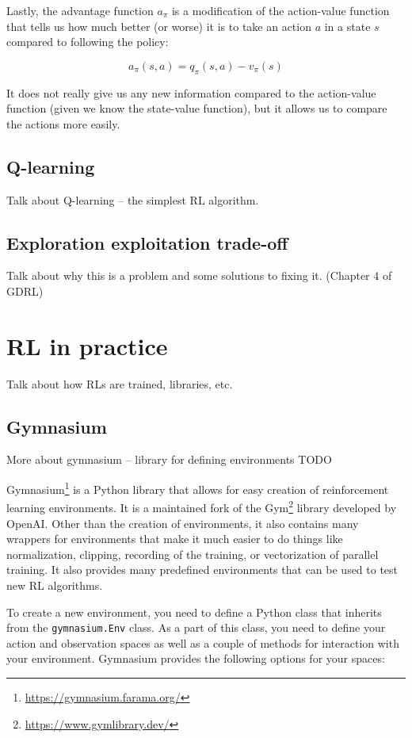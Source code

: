 \documentclass[
  digital,     %
  oneside,     %
  nosansbold,  %
  nocolorbold, %
  lof,         %
  lot,         %
]{fithesis4}
\begin{document}
Lastly, the advantage function $a_\pi$ is a modification of the action-value function that tells us how much better (or worse) it is to take an action $a$ in a state $s$ compared to following the policy:

\[
a_\pi(s,a) = q_\pi(s,a)-v_\pi(s)
\]

It does not really give us any new information compared to the action-value function (given we know the state-value function), but it allows us to compare the actions more easily.

\section{Q-learning}
Talk about Q-learning -- the simplest RL algorithm.

\section{Exploration exploitation trade-off}
Talk about why this is a problem and some solutions to fixing it. (Chapter 4 of GDRL)

\chapter{RL in practice}
Talk about how RLs are trained, libraries, etc.

\section{Gymnasium}
\label{section:gym}
More about gymnasium -- library for defining environments TODO

Gymnasium\footnote{\url{https://gymnasium.farama.org/}} is a Python library that allows for easy creation of reinforcement learning environments. It is a maintained fork of the Gym\footnote{\url{https://www.gymlibrary.dev/}} library developed by OpenAI. Other than the creation of environments, it also contains many wrappers for environments that make it much easier to do things like normalization, clipping, recording of the training, or vectorization of parallel training. It also provides many predefined environments that can be used to test new RL algorithms.

To create a new environment, you need to define a Python class that inherits from the \texttt{gymnasium.Env} class. As a part of this class, you need to define your action and observation spaces as well as a couple of methods for interaction with your environment. Gymnasium provides the following options for your spaces:
\end{document}
